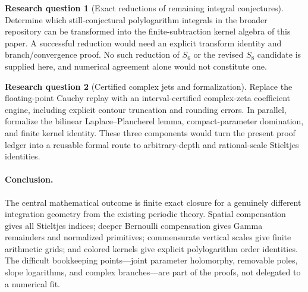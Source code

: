 \documentclass[11pt,a4paper]{article}
\theoremstyle{definition}
\newtheorem{question}{Research question}
\numberwithin{equation}{section}
\begin{document}
\begin{question}[Exact reductions of remaining integral conjectures]
Determine which still-conjectural polylogarithm integrals in the broader
repository can be transformed into the finite-subtraction kernel algebra
of this paper. A successful reduction would need an explicit transform
identity and branch/convergence proof. No such reduction of $S_6$ or the
revised $S_8$ candidate is supplied here, and numerical agreement alone
would not constitute one.
\end{question}

\begin{question}[Certified complex jets and formalization]
Replace the floating-point Cauchy replay with an interval-certified
complex-zeta coefficient engine, including explicit contour truncation
and rounding errors. In parallel, formalize the bilinear
Laplace--Plancherel lemma, compact-parameter domination, and finite kernel
identity. These three components would turn the present proof ledger
into a reusable formal route to arbitrary-depth and rational-scale
Stieltjes identities.
\end{question}

\paragraph{Conclusion.}
The central mathematical outcome is finite exact closure for a genuinely
different integration geometry from the existing periodic theory. Spatial
compensation gives all Stieltjes indices; deeper Bernoulli compensation
gives Gamma remainders and normalized primitives; commensurate vertical
scales give finite arithmetic grids; and colored kernels give explicit
polylogarithm order identities. The difficult bookkeeping points---joint
parameter holomorphy, removable poles, slope logarithms, and complex
branches---are part of the proofs, not delegated to a numerical fit.
\end{document}
